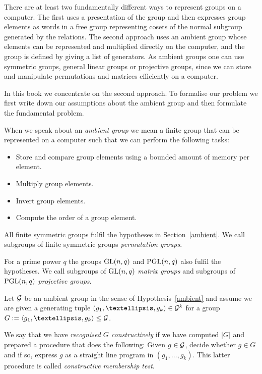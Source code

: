 There are at least two fundamentally different ways to represent groups on
a computer. The first uses a presentation of the group and then
expresses group elements as words in a free group representing
cosets of the normal subgroup generated by the relations. The second
approach uses an ambient group whose elements can be represented and
multiplied directly on the computer, and the group is defined by giving
a list of generators. As ambient groups one can use symmetric groups, general
linear groups or projective groups, since we can store and manipulate
permutations and matrices efficiently on a computer.

In this book we concentrate on the second approach. To formalise our
problem we first write down our assumptions about the ambient group
and then formulate the fundamental problem.

\begin{Hyp}
\label{ambient}
When we speak about an \emph{ambient group} we mean a finite group that can
be represented on a computer such that we can perform the following tasks:
\begin{itemize}
\item Store and compare group elements using a bounded amount of memory
per element.
\item Multiply group elements.
\item Invert group elements.
\item Compute the order of a group element.
\end{itemize}
\end{Hyp}

\begin{Rem}
All finite symmetric groups fulfil the hypotheses in Section~\ref{ambient}.
We call subgroups of finite symmetric groups \emph{permutation groups}.

For a prime power $q$ the groups $\GL(n,q)$ and $\PGL(n,q)$ also fulfil
the hypotheses. We call subgroups of $\GL(n,q)$ \emph{matrix groups}
and subgroups of $\PGL(n,q)$ \emph{projective groups}.
\end{Rem}

\begin{Problem}
\label{ProbCR1}
Let $\mathcal{G}$ be an ambient group in the sense of Hypothesis~\ref{ambient} and 
assume we are given a generating tuple $(g_1, \ldots, g_k) \in
\GG^k$ for a group
$G := \left< g_1, \ldots, g_k \right> \le \GG$. 

We say that we have \emph{recognised $G$ constructively} if we have 
computed $|G|$ and
prepared a procedure that does the following: Given $g \in \mathcal{G}$,
decide whether $g \in G$ and if so, express $g$ as a straight line program
in $(g_1, \ldots, g_k)$. This latter procedure is called \emph{constructive
membership test}.
\proofend
\end{Problem}

